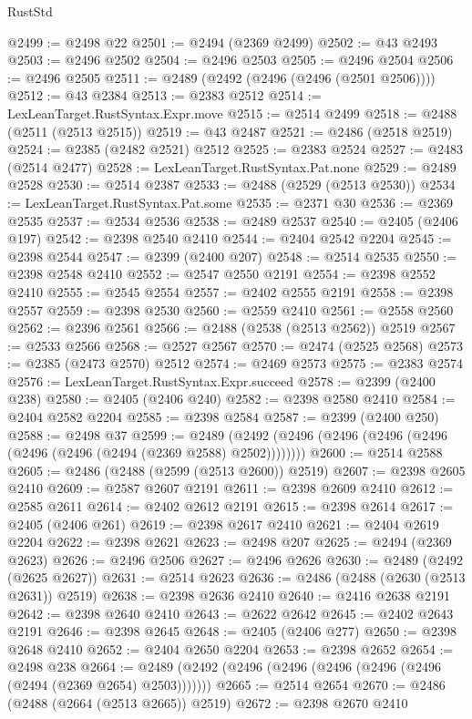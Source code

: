 \begin{lexlean}{RustStd}
\begin{coremodule}
{\begin{coremodule}
{{{{{{{{{{{{{{{{{{{{{{{{{{{{{{{{{{{{{{{{{{{{{{{{{{@2499 := @2498 @22
@2501 := @2494 (@2369 @2499)
@2502 := @43 @2493
@2503 := @2496 @2502
@2504 := @2496 @2503
@2505 := @2496 @2504
@2506 := @2496 @2505
@2511 := @2489 (@2492 (@2496 (@2496 (@2501 @2506))))
@2512 := @43 @2384
@2513 := @2383 @2512
@2514 := LexLeanTarget.RustSyntax.Expr.move
@2515 := @2514 @2499
@2518 := @2488 (@2511 (@2513 @2515))
@2519 := @43 @2487
@2521 := @2486 (@2518 @2519)
@2524 := @2385 (@2482 @2521) @2512
@2525 := @2383 @2524
@2527 := @2483 (@2514 @2477)
@2528 := LexLeanTarget.RustSyntax.Pat.none
@2529 := @2489 @2528
@2530 := @2514 @2387
@2533 := @2488 (@2529 (@2513 @2530))
@2534 := LexLeanTarget.RustSyntax.Pat.some
@2535 := @2371 @30
@2536 := @2369 @2535
@2537 := @2534 @2536
@2538 := @2489 @2537
@2540 := @2405 (@2406 @197)
@2542 := @2398 @2540 @2410
@2544 := @2404 @2542 @2204
@2545 := @2398 @2544
@2547 := @2399 (@2400 @207)
@2548 := @2514 @2535
@2550 := @2398 @2548 @2410
@2552 := @2547 @2550 @2191
@2554 := @2398 @2552 @2410
@2555 := @2545 @2554
@2557 := @2402 @2555 @2191
@2558 := @2398 @2557
@2559 := @2398 @2530
@2560 := @2559 @2410
@2561 := @2558 @2560
@2562 := @2396 @2561
@2566 := @2488 (@2538 (@2513 @2562)) @2519
@2567 := @2533 @2566
@2568 := @2527 @2567
@2570 := @2474 (@2525 @2568)
@2573 := @2385 (@2473 @2570) @2512
@2574 := @2469 @2573
@2575 := @2383 @2574
@2576 := LexLeanTarget.RustSyntax.Expr.succeed
@2578 := @2399 (@2400 @238)
@2580 := @2405 (@2406 @240)
@2582 := @2398 @2580 @2410
@2584 := @2404 @2582 @2204
@2585 := @2398 @2584
@2587 := @2399 (@2400 @250)
@2588 := @2498 @37
@2599 := @2489 (@2492 (@2496 (@2496 (@2496 (@2496 (@2496 (@2496 (@2494 (@2369 @2588) @2502))))))))
@2600 := @2514 @2588
@2605 := @2486 (@2488 (@2599 (@2513 @2600)) @2519)
@2607 := @2398 @2605 @2410
@2609 := @2587 @2607 @2191
@2611 := @2398 @2609 @2410
@2612 := @2585 @2611
@2614 := @2402 @2612 @2191
@2615 := @2398 @2614
@2617 := @2405 (@2406 @261)
@2619 := @2398 @2617 @2410
@2621 := @2404 @2619 @2204
@2622 := @2398 @2621
@2623 := @2498 @207
@2625 := @2494 (@2369 @2623)
@2626 := @2496 @2506
@2627 := @2496 @2626
@2630 := @2489 (@2492 (@2625 @2627))
@2631 := @2514 @2623
@2636 := @2486 (@2488 (@2630 (@2513 @2631)) @2519)
@2638 := @2398 @2636 @2410
@2640 := @2416 @2638 @2191
@2642 := @2398 @2640 @2410
@2643 := @2622 @2642
@2645 := @2402 @2643 @2191
@2646 := @2398 @2645
@2648 := @2405 (@2406 @277)
@2650 := @2398 @2648 @2410
@2652 := @2404 @2650 @2204
@2653 := @2398 @2652
@2654 := @2498 @238
@2664 := @2489 (@2492 (@2496 (@2496 (@2496 (@2496 (@2496 (@2494 (@2369 @2654) @2503)))))))
@2665 := @2514 @2654
@2670 := @2486 (@2488 (@2664 (@2513 @2665)) @2519)
@2672 := @2398 @2670 @2410
}}}}}}}}}}}}}}}}}}}}}}}}}}}}}}}}}}}}}}}}}}}}}}}}}}
\end{coremodule}}
\end{coremodule}
\end{lexlean}
